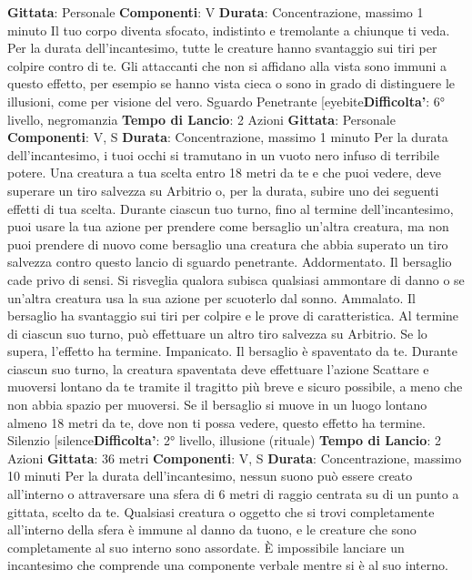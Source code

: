 \begin{multicols}{2}
\textbf{Gittata}: Personale
\textbf{Componenti}: V
\textbf{Durata}: Concentrazione, massimo 1 minuto
Il tuo corpo diventa sfocato, indistinto e tremolante a
chiunque ti veda. Per la durata dell’incantesimo, tutte le
creature hanno svantaggio sui tiri per colpire contro di
te. Gli attaccanti che non si affidano alla vista sono
immuni a questo effetto, per esempio se hanno vista
cieca o sono in grado di distinguere le illusioni, come
per visione del vero.
Sguardo Penetrante
[eyebite\textbf{Difficolta'}:
6° livello, negromanzia
\textbf{Tempo di Lancio}: 2 Azioni
\textbf{Gittata}: Personale
\textbf{Componenti}: V, S
\textbf{Durata}: Concentrazione, massimo 1 minuto
Per la durata dell’incantesimo, i tuoi occhi si tramutano
in un vuoto nero infuso di terribile potere. Una creatura
a tua scelta entro 18 metri da te e che puoi vedere,
deve superare un tiro salvezza su Arbitrio o, per la
durata, subire uno dei seguenti effetti di tua scelta.
Durante ciascun tuo turno, fino al termine
dell’incantesimo, puoi usare la tua azione per prendere
come bersaglio un’altra creatura, ma non puoi prendere
di nuovo come bersaglio una creatura che abbia
superato un tiro salvezza contro questo lancio di
sguardo penetrante.
Addormentato. Il bersaglio cade privo di sensi. Si
risveglia qualora subisca qualsiasi ammontare di danno
o se un’altra creatura usa la sua azione per scuoterlo
dal sonno.
Ammalato. Il bersaglio ha svantaggio sui tiri per colpire
e le prove di caratteristica. Al termine di ciascun suo
turno, può effettuare un altro tiro salvezza su Arbitrio.
Se lo supera, l’effetto ha termine.
Impanicato. Il bersaglio è spaventato da te. Durante
ciascun suo turno, la creatura spaventata deve
effettuare l’azione Scattare e muoversi lontano da te
tramite il tragitto più breve e sicuro possibile, a meno
che non abbia spazio per muoversi. Se il bersaglio si
muove in un luogo lontano almeno 18 metri da te, dove
non ti possa vedere, questo effetto ha termine.
Silenzio
[silence\textbf{Difficolta'}:
2° livello, illusione (rituale)
\textbf{Tempo di Lancio}: 2 Azioni
\textbf{Gittata}: 36 metri
\textbf{Componenti}: V, S
\textbf{Durata}: Concentrazione, massimo 10 minuti
Per la durata dell’incantesimo, nessun suono può
essere creato all’interno o attraversare una sfera di 6
metri di raggio centrata su di un punto a gittata, scelto
da te. Qualsiasi creatura o oggetto che si trovi
completamente all’interno della sfera è immune al
danno da tuono, e le creature che sono completamente
al suo interno sono assordate. È impossibile lanciare un
incantesimo che comprende una componente verbale
mentre si è al suo interno.

\end{multicols}
